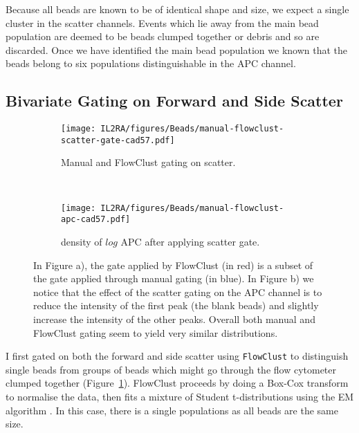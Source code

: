 Because all beads are known to be of identical shape and size, we expect a single cluster in the scatter channels.
Events which lie away from the main bead population are deemed to be beads clumped together or debris and so are discarded.
Once we have identified the main bead population we known that the beads belong to six populations distinguishable in the APC channel.


\subsection{Bivariate Gating on Forward and Side Scatter}

\begin{figure}[ht]
    \begin{subfigure}[b]{.5\textwidth}
        \centering
        \texttt{[image: IL2RA/figures/Beads/manual-flowclust-scatter-gate-cad57.pdf]} 
        \caption{Manual and FlowClust gating on scatter.}
    \end{subfigure}
    ~
    \begin{subfigure}[b]{.5\textwidth}
        \centering
        \texttt{[image: IL2RA/figures/Beads/manual-flowclust-apc-cad57.pdf]} 
        \caption{density of $log$ APC after applying scatter gate.}
    \end{subfigure}
\caption{ \label{figure:bead-gate}
  In Figure a), the gate applied by FlowClust (in red) is a subset of the gate applied through manual gating (in blue).
In Figure b) we notice that the effect of the scatter gating on the APC channel is to reduce the intensity of the first peak (the blank beads) and slightly increase the intensity of the other peaks.
Overall both manual and FlowClust gating seem to yield very similar distributions. }
\end{figure}



I first gated on both the forward and side scatter using \texttt{FlowClust} \citep{Lo:2008it}
to distinguish single beads from groups of beads which might go through the flow cytometer clumped together (Figure~\ref{figure:bead-gate}).
FlowClust proceeds by doing a Box-Cox transform to normalise the data, then fits a mixture of Student t-distributions
using the EM algorithm \citep{Dempster:1977ul}. In this case, there is a single populations as all beads are the same size.


